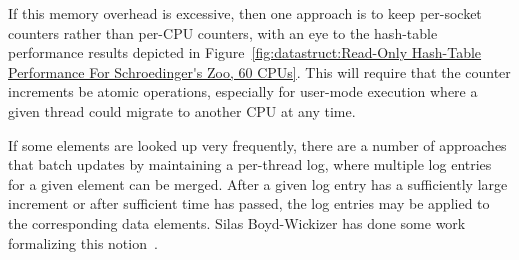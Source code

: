 If this memory overhead is excessive, then one approach is to keep
per-socket counters rather than per-CPU counters,
with an eye to the hash-table performance results depicted in
Figure~\ref{fig:datastruct:Read-Only Hash-Table Performance For Schroedinger's Zoo, 60 CPUs}.
This will require that the counter increments be atomic operations,
especially for user-mode execution where a given thread could migrate
to another CPU at any time.

If some elements are looked up very frequently, there are a number
of approaches that batch updates by maintaining a per-thread log,
where multiple log entries for a given element can be merged.
After a given log entry has a sufficiently large increment or after
sufficient time has passed, the log entries may be applied to the
corresponding data elements.
Silas Boyd-Wickizer has done some work formalizing this
notion~\cite{SilasBoydWickizerPhD}.
\fi
